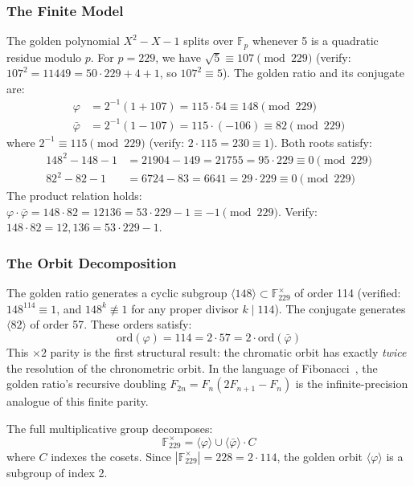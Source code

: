 \documentclass[12pt,oneside]{article}
\theoremstyle{principia}
\theoremstyle{definition}
\theoremstyle{remark}
\providecommand{\FF}{\mathbb{F}}
\providecommand{\vp}{\varphi}
\providecommand{\vpbar}{\bar{\varphi}}
\begin{document}
\subsubsection*{The Finite Model}

The golden polynomial $X^2 - X - 1$ splits over $\FF_p$ whenever 5 is a quadratic residue modulo $p$. For $p = 229$, we have $\sqrt{5} \equiv 107 \pmod{229}$ (verify: $107^2 = 11449 = 50 \cdot 229 + 4 + 1$, so $107^2 \equiv 5$). The golden ratio and its conjugate are:
\begin{align}
\vp &= 2^{-1}(1 + 107) = 115 \cdot 54 \equiv 148 \pmod{229} \\
\vpbar &= 2^{-1}(1 - 107) = 115 \cdot (-106) \equiv 82 \pmod{229}
\end{align}
where $2^{-1} \equiv 115 \pmod{229}$ (verify: $2 \cdot 115 = 230 \equiv 1$). Both roots satisfy:
\begin{align}
148^2 - 148 - 1 &= 21904 - 149 = 21755 = 95 \cdot 229 \equiv 0 \pmod{229} \\
82^2 - 82 - 1 &= 6724 - 83 = 6641 = 29 \cdot 229 \equiv 0 \pmod{229}
\end{align}
The product relation holds: $\vp \cdot \vpbar = 148 \cdot 82 = 12136 = 53 \cdot 229 - 1 \equiv -1 \pmod{229}$. Verify: $148 \cdot 82 = 12{,}136 = 53 \cdot 229 - 1$.

\subsubsection*{The Orbit Decomposition}

The golden ratio generates a cyclic subgroup $\langle 148 \rangle \subset \FF_{229}^\times$ of order 114 (verified: $148^{114} \equiv 1$, and $148^k \not\equiv 1$ for any proper divisor $k \mid 114$). The conjugate generates $\langle 82 \rangle$ of order 57. These orders satisfy:
\begin{equation}\label{eq:parity}
\mathrm{ord}(\vp) = 114 = 2 \cdot 57 = 2 \cdot \mathrm{ord}(\vpbar)
\end{equation}
This $\times 2$ parity is the first structural result: the chromatic orbit has exactly \emph{twice} the resolution of the chronometric orbit. In the language of Fibonacci~\cite{fibonacci}, the golden ratio's recursive doubling $F_{2n} = F_n(2F_{n+1} - F_n)$ is the infinite-precision analogue of this finite parity.

The full multiplicative group decomposes:
$$\FF_{229}^\times = \langle\vp\rangle \cup \langle\vpbar\rangle \cdot C$$
where $C$ indexes the cosets. Since $|\FF_{229}^\times| = 228 = 2 \cdot 114$, the golden orbit $\langle\vp\rangle$ is a subgroup of index 2.
\end{document}
